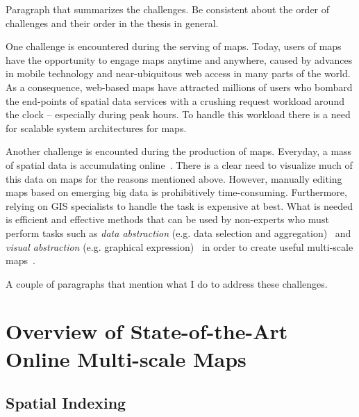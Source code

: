 Paragraph that summarizes the challenges. Be consistent about the order of challenges and their order in the thesis in general.

One challenge is encountered during the serving of maps. Today, users of maps have the opportunity to engage maps anytime and anywhere, caused by advances in mobile technology and near-ubiquitous web access in many parts of the world. As a consequence, web-based maps have attracted millions of users who bombard the end-points of spatial data services with a crushing request workload around the clock -- especially during peak hours. To handle this workload there is a need for scalable system architectures for maps. %

Another challenge is encounted during the production of maps. Everyday, a mass of spatial data is accumulating online~\cite{agrawal2012bigdata}. There is a clear need to visualize much of this data on maps for the reasons mentioned above. However, manually editing maps based on emerging big data is prohibitively time-consuming. Furthermore, relying on GIS specialists to handle the task is expensive at best. What is needed is efficient and effective methods that can be used by non-experts who must perform tasks such as \emph{data abstraction} (e.g. data selection and aggregation)~\cite{haunert2006landcover,schmid2013opensciencemap} and \emph{visual abstraction} (e.g. graphical expression)~\cite{jacques1967semiologie} in order to create useful multi-scale maps~\cite{stolte2003multiscale,weibel1999generalising}. 

A couple of paragraphs that mention what I do to address these challenges. 


\section{Overview of State-of-the-Art Online Multi-scale Maps}
\subsection{Spatial Indexing}
